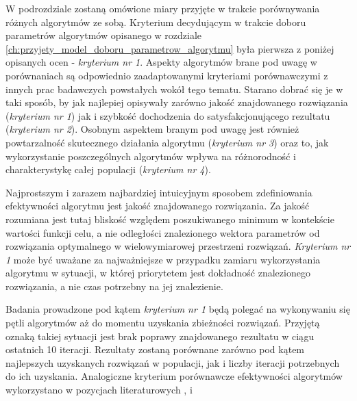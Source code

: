 \par
W podrozdziale zostaną omówione miary przyjęte w trakcie porównywania różnych algorytmów ze sobą. Kryterium decydującym w trakcie doboru parametrów algorytmów opisanego w rozdziale \ref{ch:przyjety_model_doboru_parametrow_algorytmu} była pierwsza z poniżej opisanych ocen - \emph{kryterium nr 1}. Aspekty algorytmów brane pod uwagę w porównaniach są odpowiednio zaadaptowanymi kryteriami porównawczymi z innych prac badawczych powstałych wokół tego tematu. Starano dobrać się je w taki sposób, by jak najlepiej opisywały zarówno jakość znajdowanego rozwiązania (\emph{kryterium nr 1}) jak i szybkość dochodzenia do satysfakcjonującego rezultatu (\emph{kryterium nr 2}). Osobnym aspektem branym pod uwagę jest również powtarzalność skutecznego działania algorytmu (\emph{kryterium nr 3}) oraz to, jak wykorzystanie poszczególnych algorytmów wpływa na różnorodność i charakterystykę całej populacji (\emph{kryterium nr 4}).

\par 
Najprostszym i zarazem najbardziej intuicyjnym sposobem zdefiniowania efektywności algorytmu jest jakość znajdowanego rozwiązania. Za jakość rozumiana jest tutaj bliskość względem poszukiwanego minimum w kontekście wartości funkcji celu, a nie odległości znalezionego wektora parametrów od rozwiązania optymalnego w wielowymiarowej przestrzeni rozwiązań. \emph{Kryterium nr 1} może być uważane za najważniejsze w przypadku zamiaru wykorzystania algorytmu w sytuacji, w której priorytetem jest dokładność znalezionego rozwiązania, a nie czas potrzebny na jej znalezienie. 
\par
Badania prowadzone pod kątem \emph{kryterium nr 1} będą polegać na wykonywaniu się pętli algorytmów aż do momentu uzyskania zbieżności rozwiązań. Przyjętą oznaką takiej sytuacji jest brak poprawy znajdowanego rezultatu w ciągu ostatnich 10 iteracji. Rezultaty zostaną porównane zarówno pod kątem najlepszych uzyskanych rozwiązań w populacji, jak i liczby iteracji potrzebnych do ich uzyskania. Analogiczne kryterium porównawcze efektywności algorytmów wykorzystano w pozycjach literaturowych \cite{boyabatli2004parameter}, \cite{elbeltagi2005comparison} i \cite{ong2006classification}

